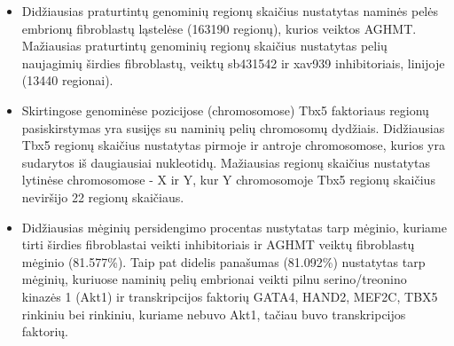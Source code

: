 \documentclass[12pt]{article}
\begin{document}
\begin{itemize}
    \item Didžiausias praturtintų genominių regionų skaičius nustatytas naminės
        pelės embrionų fibroblastų ląstelėse (163190 regionų), kurios veiktos
        AGHMT. Mažiausias praturtintų genominių regionų skaičius nustatytas
        pelių naujagimių širdies fibroblastų, veiktų sb431542 ir xav939
        inhibitoriais, linijoje (13440 regionai).
    \item Skirtingose genominėse pozicijose (chromosomose) Tbx5 faktoriaus
        regionų pasiskirstymas yra susijęs su naminių pelių chromosomų dydžiais.
        Didžiausias Tbx5 regionų skaičius nustatytas pirmoje ir antroje
        chromosomose, kurios yra sudarytos iš daugiausiai nukleotidų.
        Mažiausias regionų skaičius nustatytas lytinėse chromosomose - X ir Y,
        kur Y chromosomoje Tbx5 regionų skaičius neviršijo 22 regionų skaičiaus.
    \item Didžiausias mėginių persidengimo procentas nustytatas tarp mėginio,
        kuriame tirti širdies fibroblastai veikti inhibitoriais ir AGHMT
        veiktų fibroblastų mėginio (81.577\%). Taip pat didelis panašumas
        (81.092\%) nustatytas tarp mėginių, kuriuose naminių pelių embrionai
        veikti pilnu serino/treonino kinazės 1 (Akt1) ir transkripcijos
        faktorių GATA4, HAND2, MEF2C, TBX5 rinkiniu bei rinkiniu, kuriame
        nebuvo Akt1, tačiau buvo transkripcijos faktorių.
\end{itemize}


\newpage

\end{document}
